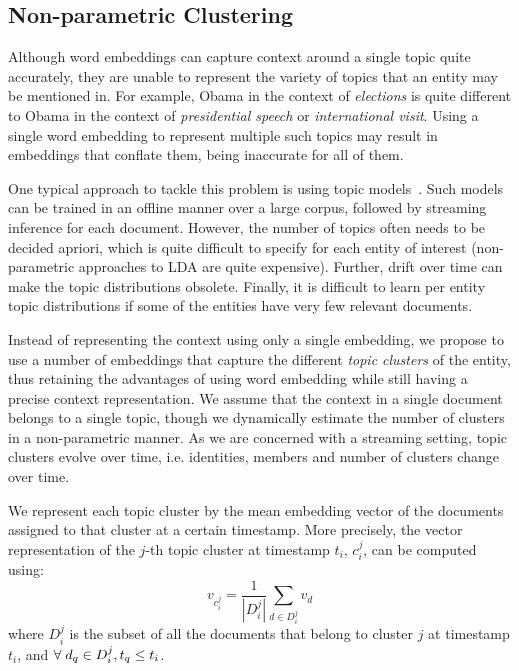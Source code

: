 \documentclass{article}
\begin{document}
\subsection{Non-parametric Clustering}
\label{non}

Although word embeddings can capture context around a single topic quite accurately, they are unable to represent the variety of topics that an entity may be mentioned in.
For example, Obama in the context of \emph{elections} is quite different to Obama in the context of \emph{presidential speech} or \emph{international visit}.
Using a single word embedding to represent multiple such topics may result in embeddings that conflate them, being inaccurate for all of them.

One typical approach to tackle this problem is using topic models~\cite{blei12}.
Such models can be trained in an offline manner over a large corpus, followed by streaming inference for each document.
However, the number of topics often needs to be decided apriori, which is quite difficult to specify for each entity of interest (non-parametric approaches to LDA are quite expensive).
Further, drift over time can make the topic distributions obsolete.
Finally, it is difficult to learn per entity topic distributions if some of the entities have very few relevant documents.


Instead of representing the context using only a single embedding, we propose to use a number of embeddings that capture the different \emph{topic clusters} of the entity, thus retaining the advantages of using word embedding while still having a precise context representation.
We assume that the context in a single document belongs to a single topic, though we dynamically estimate the number of clusters in a non-parametric manner.
As we are concerned with a streaming setting, topic clusters evolve over time, i.e. identities, members and number of clusters change over time. 

We represent each topic cluster by the mean embedding vector of the documents assigned to that cluster at a certain timestamp.
More precisely, the vector representation of the $j$-th topic cluster at timestamp $t_i$, $c^j_i$, can be computed using: %
\begin{equation}
\label{nonparamclust}
v_{c^j_i} = \frac{1}{|D^j_i|} \sum_{d \in D^j_i}{v_d}
\end{equation}
where $D^j_i$ is the subset of all the documents that belong to cluster $j$ at timestamp $t_i$, and $\forall\hspace{1mm}d_q \in D^j_i, t_q \leq t_i$.
\end{document}
